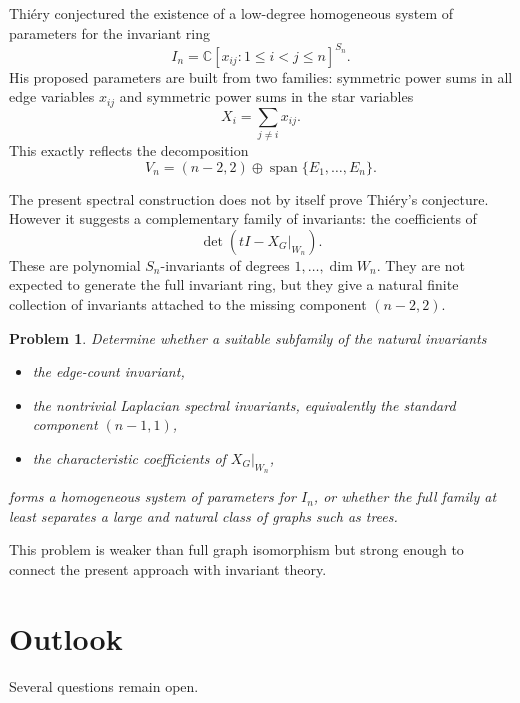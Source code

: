 \documentclass{amsart}
\newtheorem{problem}{Problem}
\theoremstyle{definition}
\newcommand{\C}{\mathbb C}
\begin{document}
Thi\'ery \cite{Thiery} conjectured the existence of a low-degree homogeneous system of
parameters for the invariant ring
\[
I_n=\C[x_{ij}:1\le i<j\le n]^{S_n}.
\]
His proposed parameters are built from two families: symmetric power sums
in all edge variables $x_{ij}$ and symmetric power sums in the star
variables
\[
X_i=\sum_{j\ne i}x_{ij}.
\]
This exactly reflects the decomposition
\[
V_n=(n-2,2)\oplus\operatorname{span}\{E_1,\ldots,E_n\}.
\]

The present spectral construction does not by itself prove Thi\'ery's
conjecture.  However it suggests a complementary family of invariants:
the coefficients of
\[
\det\left(tI-X_G|_{W_n}\right).
\]
These are polynomial $S_n$-invariants of degrees
$1,\ldots,\dim W_n$.  They are not expected to generate the full invariant
ring, but they give a natural finite collection of invariants attached to
the missing component $(n-2,2)$.

\begin{problem}
Determine whether a suitable subfamily of the natural invariants
\begin{itemize}[leftmargin=2em]
\item the edge-count invariant,
\item the nontrivial Laplacian spectral invariants, equivalently the standard
component $(n-1,1)$,
\item the characteristic coefficients of $X_G|_{W_n}$,
\end{itemize}
forms a homogeneous system of parameters for $I_n$, or whether the full family
at least separates a large and natural class of graphs such as trees.
\end{problem}

This problem is weaker than full graph isomorphism but strong enough to
connect the present approach with invariant theory.


\section{Outlook}

Several questions remain open.
\end{document}
